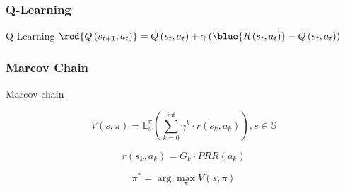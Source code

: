 \subsubsection{Q-Learning}
\begin{frame}{Q Learning}{}
	$\red{Q\left(s_{t+1}, a_{t}\right)}=Q\left(s_{t}, a_{t}\right)+\gamma\left(\blue{R\left(s_{t}, a_{t}\right)}-Q\left(s_{t}, a_{t}\right)\right)$

\end{frame}


\subsubsection{Marcov Chain}

\begin{frame}{Marcov chain}{}

\begin{flushleft}
\begin{equation}
V(s, \pi)=\mathbb{E}_{s}^{\pi}\left(\sum_{k=0}^{\mathrm{inf}} \gamma^{k} \cdot r\left(s_{k}, a_{k}\right)\right), s \in \mathbb{S}
\end{equation}

\begin{equation}
r\left(s_{k}, a_{k}\right)=G_{k} \cdot P R R\left(a_{k}\right)
\end{equation}

\begin{equation}
\pi^{*}=\arg \max _{\pi} V(s, \pi)
\end{equation}



\end{flushleft}

\end{frame}

